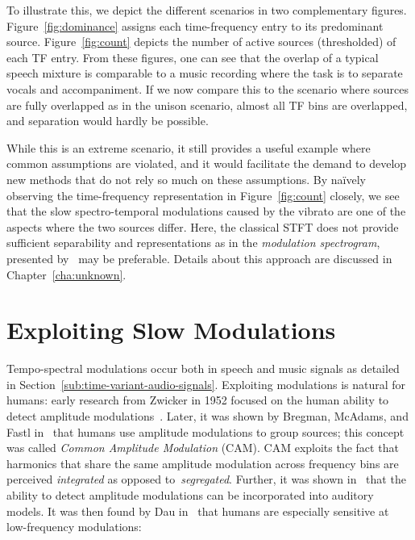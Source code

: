 To illustrate this, we depict the different scenarios in two complementary figures.
Figure~\ref{fig:dominance} assigns each time-frequency entry to its predominant source.
Figure~\ref{fig:count} depicts the number of active sources (thresholded) of each TF entry.
From these figures, one can see that the overlap of a typical speech mixture is comparable to a music recording where the task is to separate vocals and accompaniment.
If we now compare this to the scenario where sources are fully overlapped as in the unison scenario, almost all TF bins are overlapped, and separation would hardly be possible.
\par
While this is an extreme scenario, it still provides a useful example where common assumptions are violated, and it would facilitate the demand to develop new methods that do not rely so much on these assumptions.
By naïvely observing the time-frequency representation in Figure~\ref{fig:count} closely, we see that the slow spectro-temporal modulations caused by the vibrato are one of the aspects where the two sources differ.
Here, the classical STFT does not provide sufficient separability and representations as in the \emph{modulation spectrogram}, presented by~\cite{greenberg96} may be preferable.
Details about this approach are discussed in Chapter~\ref{cha:unknown}.

\hypertarget{exploiting-slow-modulations}{%
\section{Exploiting Slow Modulations}\label{exploiting-slow-modulations}}

Tempo-spectral modulations occur both in speech and music signals as detailed in Section~\ref{sub:time-variant-audio-signals}.
Exploiting modulations is natural for humans: early research from Zwicker in 1952 focused on the human ability to detect amplitude modulations~\cite{zwicker52}. 
Later, it was shown by Bregman, McAdams, and Fastl in~\cite{mcadams89, bregman90, fastl90} that humans use amplitude modulations to group sources; this concept was called \emph{Common Amplitude Modulation} (CAM).
CAM exploits the fact that harmonics that share the same amplitude modulation across frequency bins are perceived \emph{integrated} as opposed to~\emph{segregated}.
Further, it was shown in~\cite{bacon89} that the ability to detect amplitude modulations can be incorporated into auditory models.
It was then found by Dau in~\cite{dau99} that humans are especially sensitive at low-frequency modulations:

